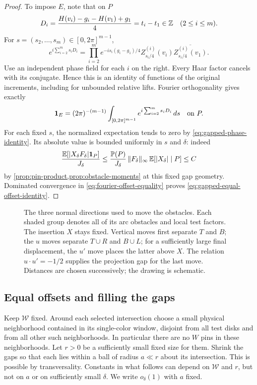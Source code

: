 \begin{proof}
To impose $E$, note that on $P$
\[
 D_i=\frac{H(v_i)-g_i-H(v_1)+g_1}{4}=t_i-t_1\in\mathbb Z
 \quad(2\le i\le m).
\]
For $s=(s_2,\ldots,s_m)\in[0,2\pi]^{m-1}$,
\begin{equation}\label{eq:balanced-offset-phases}
 e^{i\sum_{i=2}^m s_iD_i}
 =\prod_{i=2}^m
   e^{-is_i(g_i-g_1)/4}
   Z_{s_i/4}^{(i)}(v_i)
   \overline{Z_{s_i/4}^{(i)}(v_1)}.
\end{equation}
Use an independent phase field for each $i$ on the right.  Every
Haar factor cancels with its conjugate.  Hence this is an identity
of functions of the original increments, including for unbounded
relative lifts.  Fourier orthogonality gives exactly
\begin{equation}\label{eq:fourier-offset-equality}
 \mathbf 1_E=(2\pi)^{-(m-1)}
   \int_{[0,2\pi]^{m-1}}e^{i\sum_{i=2}^m s_iD_i}\,ds
 \quad\text{on }P.
\end{equation}
For each fixed $s$, the normalized expectation tends to zero by
\eqref{eq:gapped-phase-identity}.  Its absolute value is bounded
uniformly in $s$ and $\delta$: indeed
\[
 \frac{\mathbb E[|X_\delta F_\delta|\mathbf 1_P]}{J_\delta}
 \le \frac{\mathbb P(P)}{J_\delta}\,
       \|F_\delta\|_\infty\,
       \mathbb E[|X_\delta|\mid P]\le C
\]
by \cref{prop:pin-product,prop:obstacle-moments} at this fixed
gap geometry.  Dominated convergence in
\eqref{eq:fourier-offset-equality} proves
\eqref{eq:gapped-equal-offset-identity}.
\end{proof}

\begin{figure}[t]
 \centering
 
 \caption{The three normal directions used to move the obstacles.
 Each shaded group denotes all of its arc obstacles and local test
 factors.  The insertion $X$ stays fixed.  Vertical moves first
 separate $T$ and $B$; the $u$ moves separate $T\cup R$ and
 $B\cup L$; for a sufficiently large final displacement, the
 $u'$ move places the latter above $X$.
 The relation $u\cdot u'=-1/2$ supplies the projection gap for
 the last move.  Distances are chosen successively; the drawing is
 schematic.}\label{fig:pin-moving}
\end{figure}

\subsection{Equal offsets and filling the gaps}

Keep $\mathcal W$ fixed.  Around each selected intersection choose
a small physical neighborhood contained in its single-color
window, disjoint from all test disks and from all other such
neighborhoods.  In particular there are no $W$ pins in these
neighborhoods.  Let $r>0$ be a sufficiently small fixed size for
them.  Shrink the gaps so that each lies within a ball of radius
$a\ll r$ about its intersection.  This is possible by
transversality.  Constants in what follows can depend on
$\mathcal W$ and $r$, but not on $a$ or on sufficiently small
$\delta$.  We write $o_\delta(1)$ with $a$ fixed.

